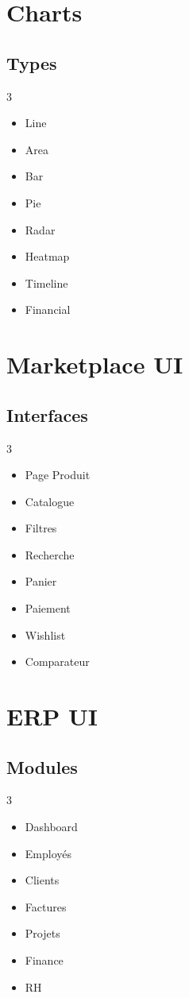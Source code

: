 \documentclass[12pt,a4paper,oneside]{book}
\begin{document}
\chapter{Charts}

\section{Types}
\begin{multicols}{3}
\begin{itemize}
\item Line
\item Area
\item Bar
\item Pie
\item Radar
\item Heatmap
\item Timeline
\item Financial
\end{itemize}
\end{multicols}

\chapter{Marketplace UI}

\section{Interfaces}
\begin{multicols}{3}
\begin{itemize}
\item Page Produit
\item Catalogue
\item Filtres
\item Recherche
\item Panier
\item Paiement
\item Wishlist
\item Comparateur
\end{itemize}
\end{multicols}

\chapter{ERP UI}

\section{Modules}
\begin{multicols}{3}
\begin{itemize}
\item Dashboard
\item Employés
\item Clients
\item Factures
\item Projets
\item Finance
\item RH
\end{itemize}
\end{multicols}
\end{document}
